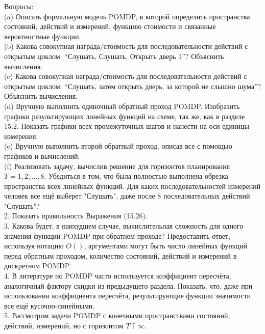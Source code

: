 \documentclass[10pt,a4paper]{article}
\begin{document}
Вопросы:\\

(a)	Описать формальную модель POMDP, в которой определить пространства состояний, действий и измерений, функцию стоимости и связанные вероятностные функции.\\

(b)	Какова совокупная награда/стоимость для последовательности действий с открытым циклом: “Слушать, Слушать, Открыть дверь 1”? Объяснить вычисления.\\

(c)	Какова совокупная награда/стоимость для последовательности действий с открытым циклом: “Слушать, затем открыть дверь, за которой не слышно шума”? Объяснить вычисления.\\

(d)	Вручную выполнить одиночный обратный проход POMDP. Изобразить графики результирующих линейных функций на схеме, так же, как в разделе 15.2. Показать графики всех промежуточных шагов и нанести на оси единицы измерения.\\

(e)	Вручную выполнить второй обратный проход, описав все с помощью графиков и вычислений.\\

(f)	Реализовать задачу, вычислив решение для горизонтов планирования $T = 1, 2,..., 8$. Убедиться в том, что была полностью выполнена обрезка пространства всех линейных функций. Для каких последовательностей измерений человек все ещё выберет "Слушать", даже после 8 последовательных действий "Слушать"?\\

2.	Показать правильность Выражения (15.26).\\

3.	Какова будет, в наихудшем случае, вычислительная сложность для одного значения функции POMDP при обратном проходе? Предоставить ответ, используя нотацию $O( )$, аргументами могут быть число линейных функций перед обратным проходом, количество состояний, действий и измерений в дискретном POMDP. \\

4.	В литературе по POMDP часто используется коэффициент пересчёта, аналогичный фактору скидки из предыдущего раздела. Показать, что, даже при использовании коэффициента пересчёта, результирующие функции значимости все ещё кусочно-линейными.\\

5.	Рассмотрим задачи POMDP с конечными пространствами состояний, действий, измерений, но с горизонтом $T\uparrow \infty$.\\
\end{document}
